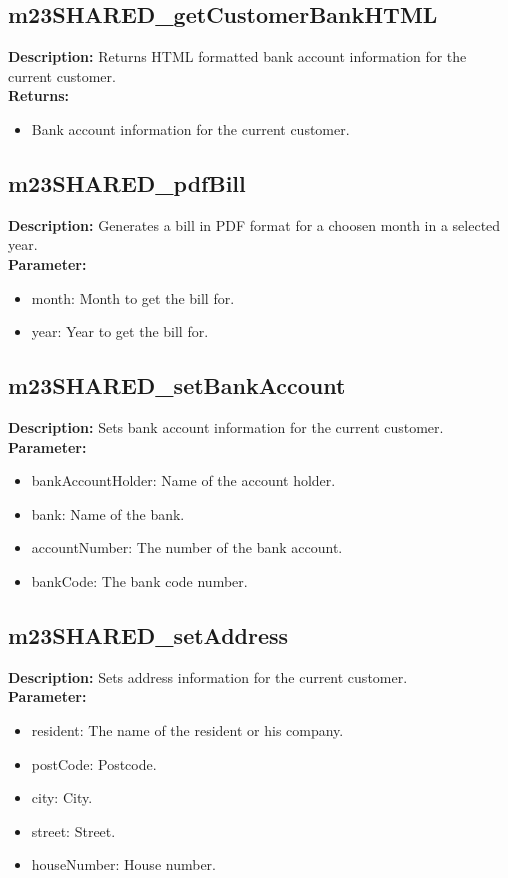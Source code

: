 \subsection{m23SHARED\_getCustomerBankHTML}
\textbf{Description:} Returns HTML formatted bank account information for the current customer.\\
\textbf{Returns:}
\begin{itemize}
\item Bank account information for the current customer.
\end{itemize}

\subsection{m23SHARED\_pdfBill}
\textbf{Description:} Generates a bill in PDF format for a choosen month in a selected year.\\
\textbf{Parameter:}
\begin{itemize}
\item month: Month to get the bill for.
\item year: Year to get the bill for.
\end{itemize}

\subsection{m23SHARED\_setBankAccount}
\textbf{Description:} Sets bank account information for the current customer.\\
\textbf{Parameter:}
\begin{itemize}
\item bankAccountHolder: Name of the account holder.
\item bank: Name of the bank.
\item accountNumber: The number of the bank account.
\item bankCode: The bank code number.
\end{itemize}

\subsection{m23SHARED\_setAddress}
\textbf{Description:} Sets address information for the current customer.\\
\textbf{Parameter:}
\begin{itemize}
\item resident: The name of the resident or his company.
\item postCode: Postcode.
\item city: City.
\item street: Street.
\item houseNumber: House number.
\end{itemize}

